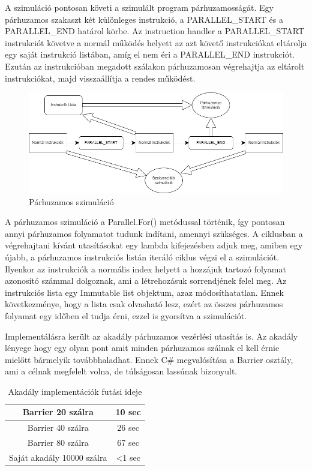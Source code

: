 A szimuláció pontosan követi a szimulált program párhuzamosságát. Egy párhuzamos szakaszt két különleges instrukció, a PARALLEL{\_}START és a PARALLEL{\_}END határol körbe. Az instruction handler a PARALLEL{\_}START instrukciót követve a normál működés helyett az azt követő instrukciókat eltárolja egy saját instrukció listában, amíg el nem éri a PARALLEL{\_}END instrukciót. Ezután az instrukcióban megadott szálakon párhuzamosan végrehajtja az eltárolt instrukciókat, majd visszaállítja a rendes működést.


\begin{figure}[h]
\centering
\includegraphics[scale=0.5]{images/Parallel_Simulation.jpg}
\caption{Párhuzamos szimuláció}
\label{fig:parallelSim}
\end{figure}


A párhuzamos szimuláció a Parallel.For() metódussal történik, így pontosan annyi párhuzamos folyamatot tudunk indítani, amennyi szükséges. A ciklusban a végrehajtani kívánt utasításokat egy lambda kifejezésben adjuk meg, amiben egy újabb, a párhuzamos instrukciós listán iteráló ciklus végzi el a szimulációt. Ilyenkor az instrukciók a normális index helyett a hozzájuk tartozó folyamat azonosító számmal dolgoznak, ami a létrehozásuk sorrendjének felel meg. Az instrukciós lista egy Immutable list objektum, azaz módosíthatatlan. Ennek következménye, hogy a lista csak olvasható lesz, ezért az összes párhuzamos folyamat egy időben el tudja érni, ezzel is gyorsítva a szimulációt.

Implementálásra került az akadály párhuzamos vezérlési utasítás is. Az akadály lényege hogy egy olyan pont amit minden párhuzamos szálnak el kell érnie mielőtt bármelyik továbbhaladhat. Ennek C\# megvalósítása a Barrier osztály, ami a célnak megfelelt volna, de túlságosan lassúnak bizonyult.



\begin{table}[h]
\centering
\caption{Akadály implementációk futási ideje}
\label{tab:barrier}
\begin{tabular}{|c|c|}
\hline
Barrier 20 szálra & 10 sec  \\
\hline
Barrier 40 szálra & 26 sec \\
\hline
Barrier 80 szálra & 67 sec \\
\hline 
Saját akadály 10000 szálra & <1 sec \\
\hline
\end{tabular}
\end{table}

